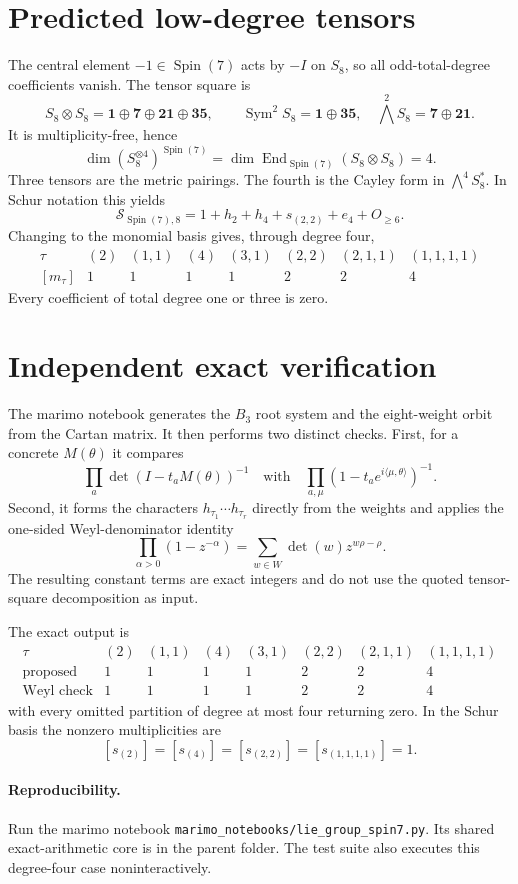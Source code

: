 \documentclass[10pt]{article}
\newcommand{\Sg}{\mathcal S}
\begin{document}
\section{Predicted low-degree tensors}
The central element $-1\in\operatorname{Spin}(7)$ acts by $-I$ on $S_8$,
so all odd-total-degree coefficients vanish.  The tensor square is
\[
 S_8\otimes S_8=\mathbf1\oplus\mathbf7\oplus\mathbf{21}\oplus\mathbf{35},
 \qquad
 \operatorname{Sym}^2S_8=\mathbf1\oplus\mathbf{35},\quad
 \bigwedge^2S_8=\mathbf7\oplus\mathbf{21}.
\]
It is multiplicity-free, hence
\[
 \dim(S_8^{\otimes4})^{\operatorname{Spin}(7)}
 =\dim\operatorname{End}_{\operatorname{Spin}(7)}(S_8\otimes S_8)=4.
\]
Three tensors are the metric pairings.  The fourth is the Cayley form in
$\bigwedge^4S_8^*$.  In Schur notation this yields
\[
 \boxed{\Sg_{\operatorname{Spin}(7),8}
 =1+h_2+h_4+s_{(2,2)}+e_4+O_{\ge6}.}
\]
Changing to the monomial basis gives, through degree four,
\[
\begin{array}{c|rrrrrrr}
\tau&(2)&(1,1)&(4)&(3,1)&(2,2)&(2,1,1)&(1,1,1,1)\\ \hline
[m_\tau]&1&1&1&1&2&2&4
\end{array}
\]
Every coefficient of total degree one or three is zero.

\section{Independent exact verification}
The marimo notebook generates the $B_3$ root system and the eight-weight
orbit from the Cartan matrix.  It then performs two distinct checks.
First, for a concrete $M(\theta)$ it compares
\[
 \prod_a\det(I-t_aM(\theta))^{-1}
 \quad\text{with}\quad
 \prod_{a,\mu}(1-t_a e^{i\langle\mu,\theta\rangle})^{-1}.
\]
Second, it forms the characters $h_{\tau_1}\cdots h_{\tau_r}$ directly from
the weights and applies the one-sided Weyl-denominator identity
\[
 \prod_{\alpha>0}(1-z^{-\alpha})
 =\sum_{w\in W}\det(w)z^{w\rho-\rho}.
\]
The resulting constant terms are exact integers and do not use the quoted
tensor-square decomposition as input.

The exact output is
\[
\begin{array}{c|rrrrrrr}
\tau&(2)&(1,1)&(4)&(3,1)&(2,2)&(2,1,1)&(1,1,1,1)\\ \hline
\text{proposed}&1&1&1&1&2&2&4\\
\text{Weyl check}&1&1&1&1&2&2&4
\end{array}
\]
with every omitted partition of degree at most four returning zero.  In the
Schur basis the nonzero multiplicities are
\[
 [s_{(2)}]=[s_{(4)}]=[s_{(2,2)}]=[s_{(1,1,1,1)}]=1.
\]

\paragraph{Reproducibility.}
Run the marimo notebook \texttt{marimo\_notebooks/lie\_group\_spin7.py}.  Its shared
exact-arithmetic core is in the parent folder.  The test suite also executes
this degree-four case noninteractively.
\end{document}
